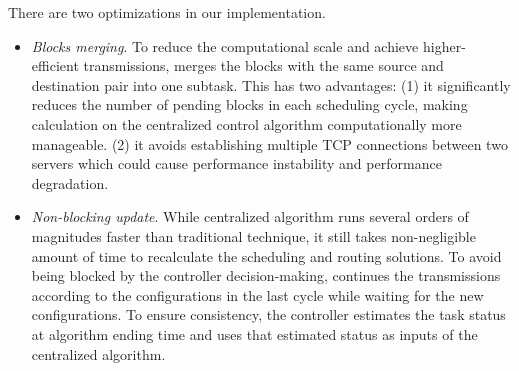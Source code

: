 There are two optimizations in our implementation.
\begin{itemize}
\item \emph{Blocks merging}.
To reduce the computational scale and achieve higher-efficient transmissions, \name merges the blocks with the same source and destination pair into one subtask.
This has two advantages: (1) it significantly reduces the number of pending blocks in each scheduling cycle, making calculation on the centralized control algorithm computationally more manageable.
(2) it avoids establishing multiple TCP connections between two servers which could cause performance instability and  performance degradation.
\item \emph{Non-blocking update}. While \name centralized algorithm runs several orders of magnitudes faster than traditional technique, it still takes non-negligible amount of time to recalculate the scheduling and routing solutions. To avoid being blocked by the controller decision-making, \name continues the transmissions according to the configurations in the last cycle while waiting for the new configurations. To ensure consistency, the controller estimates the task status at algorithm ending time and uses that estimated status as inputs of the centralized algorithm.
\end{itemize}

%
%
%
%

